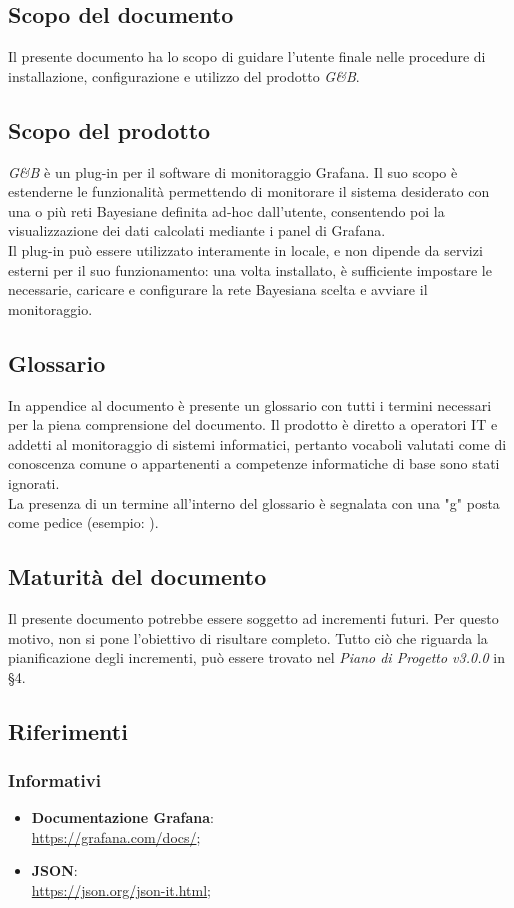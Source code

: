 \subsection{Scopo del documento}
Il presente documento ha lo scopo di guidare l'utente finale nelle procedure di installazione, configurazione e utilizzo del prodotto \emph{G\&B}.
\subsection{Scopo del prodotto}
\emph{G\&B} è un plug-in per il software di monitoraggio Grafana. Il suo scopo è estenderne le funzionalità permettendo di monitorare il sistema desiderato con una o più reti Bayesiane definita ad-hoc dall'utente, consentendo poi la visualizzazione dei dati calcolati mediante i panel di Grafana.
\\
Il plug-in può essere utilizzato interamente in locale, e non dipende da servizi esterni per il suo funzionamento: una volta installato, è sufficiente impostare le  necessarie, caricare e configurare la rete Bayesiana scelta e avviare il monitoraggio.

\subsection{Glossario}
In appendice al documento è presente un glossario con tutti i termini necessari per la piena comprensione del documento. Il prodotto è diretto a operatori IT e addetti al monitoraggio di sistemi informatici, pertanto vocaboli valutati come di conoscenza comune o appartenenti a competenze informatiche di base sono stati ignorati.\\
La presenza di un termine all'interno del glossario è segnalata con una "g" posta come pedice (esempio: ).

\subsection{Maturità del documento}
Il presente documento potrebbe essere soggetto ad incrementi futuri. Per questo motivo, non si pone l'obiettivo di risultare completo.
Tutto ciò che riguarda la pianificazione degli incrementi, può essere trovato nel \emph{Piano di Progetto v3.0.0} in §4.
\subsection{Riferimenti}
\subsubsection{Informativi}
\begin{itemize}
	\item \textbf{Documentazione Grafana}:\\ \url{https://grafana.com/docs/};
	\item \textbf{JSON}:\\ \url{https://json.org/json-it.html};
\end{itemize}
\pagebreak